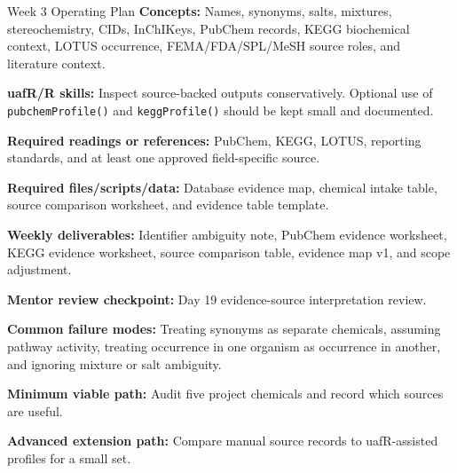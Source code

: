 \begin{checklistbox}{Week 3 Operating Plan}
\textbf{Concepts:} Names, synonyms, salts, mixtures, stereochemistry, CIDs, InChIKeys, PubChem records, KEGG biochemical context, LOTUS occurrence, FEMA/FDA/SPL/MeSH source roles, and literature context.

\textbf{uafR/R skills:} Inspect source-backed outputs conservatively. Optional use of \texttt{pubchemProfile()} and \texttt{keggProfile()} should be kept small and documented.

\textbf{Required readings or references:} PubChem, KEGG, LOTUS, reporting standards, and at least one approved field-specific source.

\textbf{Required files/scripts/data:} Database evidence map, chemical intake table, source comparison worksheet, and evidence table template.

\textbf{Weekly deliverables:} Identifier ambiguity note, PubChem evidence worksheet, KEGG evidence worksheet, source comparison table, evidence map v1, and scope adjustment.

\textbf{Mentor review checkpoint:} Day 19 evidence-source interpretation review.

\textbf{Common failure modes:} Treating synonyms as separate chemicals, assuming pathway activity, treating occurrence in one organism as occurrence in another, and ignoring mixture or salt ambiguity.

\textbf{Minimum viable path:} Audit five project chemicals and record which sources are useful.

\textbf{Advanced extension path:} Compare manual source records to uafR-assisted profiles for a small set.
\end{checklistbox}

